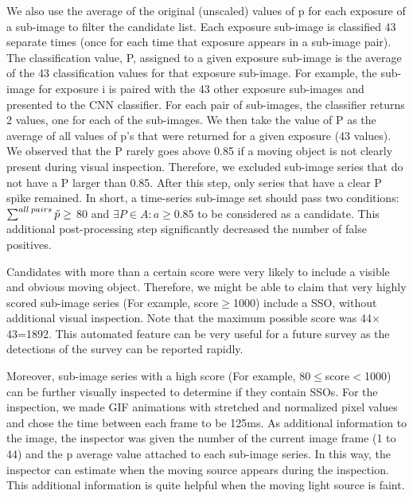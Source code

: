 \documentclass{aastex631}
\begin{document}
We also use the average of the original (unscaled) values of p for each exposure of a sub-image to filter the candidate list.
Each exposure sub-image is classified 43 separate times (once for each time that exposure appears in a sub-image pair).
The classification value, P, assigned to a given exposure sub-image is the average of the 43 classification values for that exposure sub-image.
For example, the sub-image for exposure i is paired with the 43 other exposure sub-images and presented to the CNN classifier.  
For each pair of sub-images, the classifier returns 2 values, one for each of the sub-images.  
We then take the value of P as the average of all values of p's that were returned for a given exposure (43 values). 
We observed that the P rarely goes above 0.85 if a moving object is not clearly present during visual inspection.
Therefore, we excluded sub-image series that do not have a P larger than 0.85.
After this step, only series that have a clear P spike remained.
In short, a time-series sub-image set should pass two conditions: $\sum^{all\:pairs}\Tilde{p}\geq$ 80 and $\exists P \in A : a \geq 0.85$ to be considered as a candidate.
This additional post-processing step significantly decreased the number of false positives.


Candidates with more than a certain score were very likely to include a visible and obvious moving object.
Therefore, we might be able to claim that very highly scored sub-image series (For example, score$\geq$1000) include a SSO, without additional visual inspection.
Note that the maximum possible score was 44$\times$43=1892.
This automated feature can be very useful for a future survey as the detections of the survey can be reported rapidly.

Moreover, sub-image series with a high score (For example, 80$\leq$score$<$1000) can be further visually inspected to determine if they contain SSOs.
For the inspection, we made GIF animations with stretched and normalized pixel values and chose the time between each frame to be 125ms.
As additional information to the image, the inspector was given the number of the current image frame (1 to 44) and the p average value attached to each sub-image series.
In this way, the inspector can estimate when the moving source appears during the inspection.
This additional information is quite helpful when the moving light source is faint.
\end{document}
